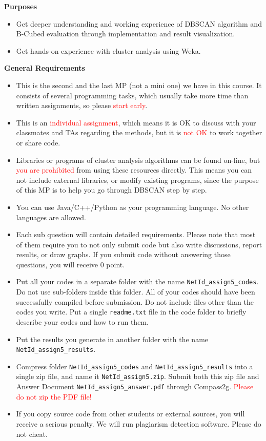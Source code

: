 \textbf{Purposes}
\begin{itemize}
\item Get deeper understanding and working experience of DBSCAN algorithm and B-Cubed evaluation through implementation and result visualization.
\item Get hands-on experience with cluster analysis using Weka.
\end{itemize}

\textbf{General Requirements}
\begin{itemize}
\item This is the second and the last MP (not a mini one) we have in this course. It consists of several programming tasks, which usually take more time than written assignments, so please \textcolor{red}{start early}.
\item This is an \textcolor{red}{individual assignment}, which means it is OK to discuss with your classmates and TAs regarding the methods, but it is \textcolor{red}{not OK} to work together or share code.
\item Libraries or programs of cluster analysis algorithms can be found on-line, but \textcolor{red}{you are prohibited} from using these resources directly. This means you can not include external libraries, or modify existing programs, since the purpose of this MP is to help you go through DBSCAN step by step.
\item You can use Java/C++/Python as your programming language. No other languages are allowed.
\item Each sub question will contain detailed requirements. Please note that most of them require you to not only submit code but also write discussions, report results, or draw graphs. If you submit code without answering those questions, you will receive 0 point.
\item Put all your codes in a separate folder with the name {\tt NetId\_assign5\_codes}. Do not use sub-folders inside this folder. All of your codes should have been successfully compiled before submission. Do not include files other than the codes you write. Put a single {\tt readme.txt} file in the code folder to briefly describe your codes and how to run them.
\item Put the results you generate in another folder with the name {\tt NetId\_assign5\_results}. 
\item Compress folder {\tt NetId\_assign5\_codes} and {\tt NetId\_assign5\_results} into a single zip file, and name it {\tt NetId\_assign5.zip}. Submit both this zip file and Answer Document {\tt NetId\_assign5\_answer.pdf} through Compass2g. \textcolor{red}{Please do not zip the PDF file!} 
\item If you copy source code from other students or external sources, you will receive a serious penalty. We will run plagiarism detection
software. Please do not cheat.
\end{itemize}

